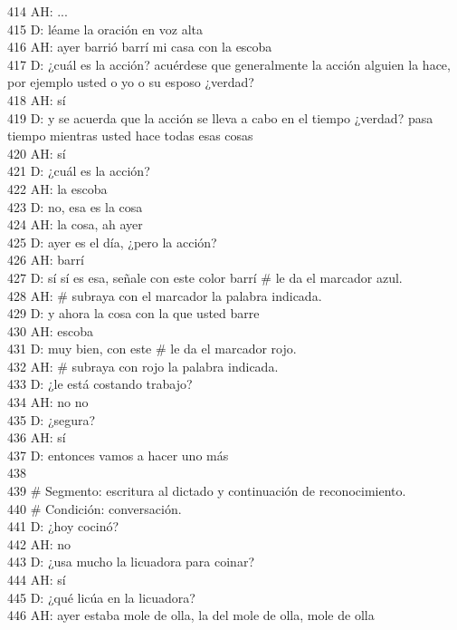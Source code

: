 414 AH: ...\\
415 D: léame la oración en voz alta\\
416 AH: ayer barrió barrí mi casa con la escoba\\
417 D: ¿cuál es la acción? acuérdese que generalmente la acción alguien la hace, por ejemplo usted o yo o su esposo ¿verdad?\\
418 AH: sí\\
419 D: y se acuerda que la acción se lleva a cabo en el tiempo ¿verdad? pasa tiempo mientras usted hace todas esas cosas\\
420 AH: sí\\
421 D: ¿cuál es la acción?\\
422 AH: la escoba\\
423 D: no, esa es la cosa\\
424 AH: la cosa, ah ayer\\
425 D: ayer es el día, ¿pero la acción?\\
426 AH: barrí\\
427 D: sí sí es esa, señale con este color barrí \# le da el marcador azul.\\
428 AH: \# subraya con el marcador la palabra indicada.\\
429 D: y ahora la cosa con la que usted barre\\
430 AH: escoba\\
431 D: muy bien, con este \# le da el marcador rojo.\\
432 AH: \# subraya con rojo la palabra indicada.\\
433 D: ¿le está costando trabajo?\\
434 AH: no no\\
435 D: ¿segura?\\
436 AH: sí\\
437 D: entonces vamos a hacer uno más\\
438 \\
439 \# Segmento: escritura al dictado y continuación de reconocimiento.\\
440 \# Condición: conversación.\\
441 D: ¿hoy cocinó?\\
442 AH: no\\
443 D: ¿usa mucho la licuadora para coinar?\\
444 AH: sí\\
445 D: ¿qué licúa en la licuadora?\\
446 AH: ayer estaba mole de olla, la del mole de olla, mole de olla\\
